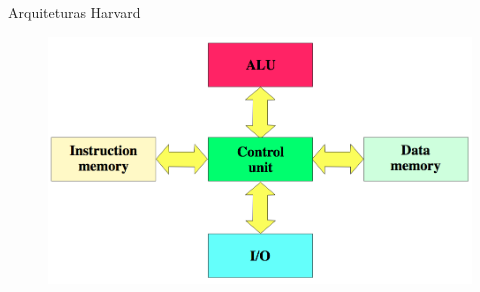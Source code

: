 \documentclass[t]{beamer}
\begin{document}
\begin{frame}{Arquiteturas}
Harvard
\begin{figure}
\includegraphics[width=\linewidth]{arquiteturaharvard}
\end{figure}
\end{frame}
\end{document}
